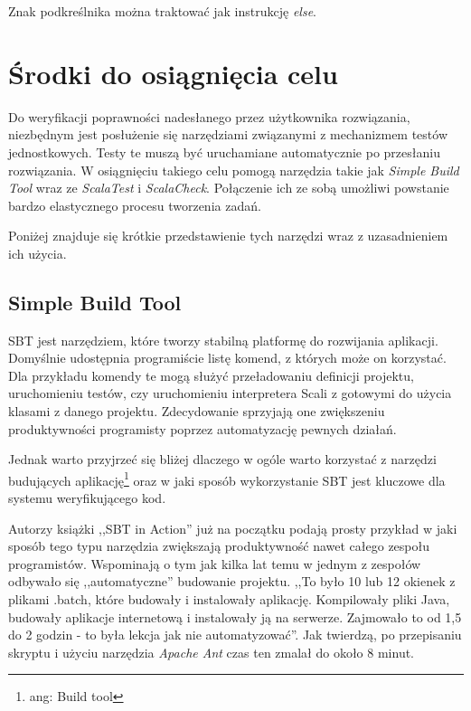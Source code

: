 \documentclass[brudnopis]{xmgr}
\begin{document}
Znak podkreślnika można traktować jak instrukcję \emph{else}.

\section{Środki do osiągnięcia celu}

Do weryfikacji poprawności nadesłanego przez użytkownika rozwiązania, niezbędnym jest posłużenie się narzędziami związanymi z mechanizmem testów jednostkowych. Testy te muszą być uruchamiane automatycznie po przesłaniu rozwiązania. W osiągnięciu takiego celu pomogą narzędzia takie jak \textit{Simple Build Tool} wraz ze \textit{ScalaTest} i \textit{ScalaCheck}. Połączenie ich ze sobą umożliwi powstanie bardzo elastycznego procesu tworzenia zadań. 

Poniżej znajduje się krótkie przedstawienie tych narzędzi wraz z uzasadnieniem ich użycia. 

\subsection{Simple Build Tool}

SBT jest narzędziem, które tworzy stabilną platformę do rozwijania aplikacji. Domyślnie udostępnia programiście listę komend, z których może on korzystać. Dla przykładu komendy te mogą służyć przeładowaniu definicji projektu, uruchomieniu testów, czy uruchomieniu interpretera Scali z gotowymi do użycia klasami z danego projektu. Zdecydowanie sprzyjają one zwiększeniu produktywności programisty poprzez automatyzację pewnych działań.

Jednak warto przyjrzeć się bliżej dlaczego w ogóle warto korzystać z narzędzi budujących aplikację\footnote{ang: Build tool} oraz w jaki sposób wykorzystanie SBT jest kluczowe dla systemu weryfikującego kod. 

Autorzy książki ,,SBT in Action'' już na początku podają prosty przykład w jaki sposób tego typu narzędzia zwiększają produktywność nawet całego zespołu programistów. Wspominają o tym jak kilka lat temu w jednym z zespołów odbywało się ,,automatyczne'' budowanie projektu. ,,To było 10 lub 12 okienek z plikami .batch, które budowały i instalowały aplikację. Kompilowały pliki Java, budowały aplikacje internetową i instalowały ją na serwerze. Zajmowało to od 1,5 do 2 godzin - to była lekcja jak nie automatyzować''.\cite[s.1]{Suereth:2014:SIA} Jak twierdzą, po przepisaniu skryptu i użyciu narzędzia \emph{Apache Ant} czas ten zmalał do około 8 minut.
\end{document}
